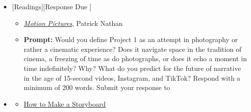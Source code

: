 \begin{itemize}[noitemsep,topsep=0pt,leftmargin=*]
    \item {}[Readings][Response Due \dThur]
          \begin{itemize}
              \item \href{https://reallifemag.com/motion-pictures/}{\emph{Motion Pictures}}, Patrick Nathan
              \item \textbf{Prompt:} Would you define Project 1 as an attempt in photography or rather a cinematic experience? Does it navigate space in the tradition of cinema, a freezing of time as do photographs, or does it echo a moment in time indefinitely? Why? What do you predict for the future of narrative in the age of 15-second videos, Instagram, and TikTok? Respond with a minimum of 200 words. Submit your response to \discordR
          \end{itemize}
    \item {}
          \begin{resenv}
              \begin{itemize}
                  \item \href{https://www.studiobinder.com/blog/how-to-make-storyboard/}{How to Make a Storyboard}
              \end{itemize}
          \end{resenv}
\end{itemize}